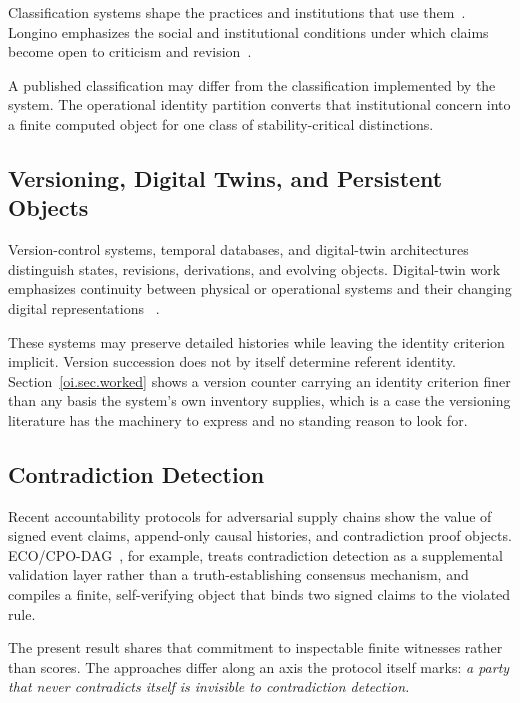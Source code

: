 \documentclass[11pt]{article}
\theoremstyle{plain}
\theoremstyle{definition}
\theoremstyle{remark}
\begin{document}
Classification systems shape
the practices and institutions that use them~\citep{bowkerstar1999}.
Longino emphasizes the social and institutional conditions
under which claims become open to criticism and revision~\citep{longino1990}.

A published classification may differ from the classification implemented by the system.
The operational identity partition converts that institutional concern
into a finite computed object for one class of stability-critical distinctions.

\subsection{Versioning, Digital Twins, and Persistent Objects}

Version-control systems,
temporal databases,
and digital-twin architectures distinguish
states, revisions, derivations, and evolving objects.
Digital-twin work emphasizes continuity
between physical or operational systems
and their changing digital representations
~\citep{grievesvickers2017,voas2025digitaltwin}.

These systems may preserve detailed histories while leaving the identity criterion implicit.
Version succession does not by itself determine referent identity.
Section~\ref{oi.sec.worked} shows a version counter
carrying an identity criterion finer than any basis
the system's own inventory supplies,
which is a case the versioning literature has the machinery to express
and no standing reason to look for.

\subsection{Contradiction Detection}

Recent accountability protocols for adversarial supply chains
show the value of signed event claims,
append-only causal histories,
and contradiction proof objects.
ECO/CPO-DAG~\citep{cochinescu2026ecocpo},
for example,
treats contradiction detection as a supplemental validation layer
rather than a truth-establishing consensus mechanism,
and compiles a finite, self-verifying object
that binds two signed claims to the violated rule.

The present result shares that commitment to inspectable finite witnesses rather than scores.
The approaches differ along an axis the protocol itself marks:
\emph{a party that never contradicts itself
  is invisible to contradiction detection.}
\end{document}
